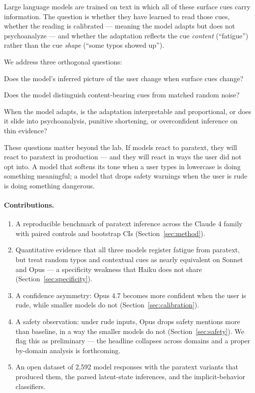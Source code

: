 \documentclass[10pt, letterpaper]{article}
\begin{document}
Large language models are trained on text in which all of these surface cues carry information. The question is whether they have learned to read those cues, whether the reading is calibrated --- meaning the model adapts but does not psychoanalyze --- and whether the adaptation reflects the cue \emph{content} (``fatigue'') rather than the cue \emph{shape} (``some typos showed up'').

We address three orthogonal questions:
\begin{description}[leftmargin=1.5em, itemsep=0pt]
  \item[Sensitivity.] Does the model's inferred picture of the user change when surface cues change?
  \item[Specificity.] Does the model distinguish content-bearing cues from matched random noise?
  \item[Calibration.] When the model adapts, is the adaptation interpretable and proportional, or does it slide into psychoanalysis, punitive shortening, or overconfident inference on thin evidence?
\end{description}

These questions matter beyond the lab. If models react to paratext, they will react to paratext in production --- and they will react in ways the user did not opt into. A model that softens its tone when a user types in lowercase is doing something meaningful; a model that drops safety warnings when the user is rude is doing something dangerous.

\paragraph{Contributions.}
\begin{enumerate}[leftmargin=1.5em, itemsep=0pt]
  \item A reproducible benchmark of paratext inference across the Claude 4 family with paired controls and bootstrap CIs (Section~\ref{sec:method}).
  \item Quantitative evidence that all three models register fatigue from paratext, but treat random typos and contextual cues as nearly equivalent on Sonnet and Opus --- a specificity weakness that Haiku does not share (Section~\ref{sec:specificity}).
  \item A confidence asymmetry: Opus 4.7 becomes more confident when the user is rude, while smaller models do not (Section~\ref{sec:calibration}).
  \item A safety observation: under rude inputs, Opus drops safety mentions more than baseline, in a way the smaller models do not (Section~\ref{sec:safety}). We flag this as preliminary --- the headline collapses across domains and a proper by-domain analysis is forthcoming.
  \item An open dataset of 2{,}592 model responses with the paratext variants that produced them, the parsed latent-state inferences, and the implicit-behavior classifiers.
\end{enumerate}
\end{document}
